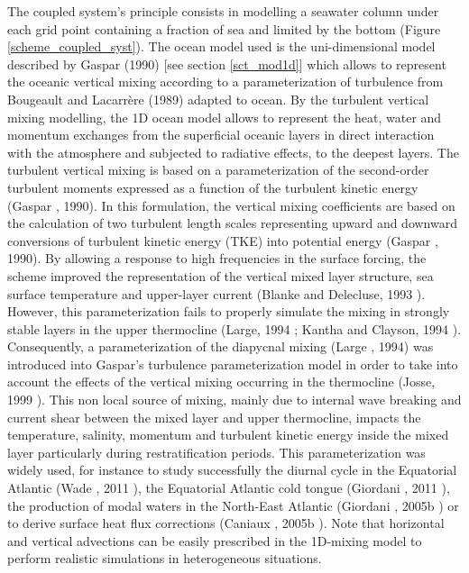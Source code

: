The coupled system's principle consists in modelling a seawater column under each grid point containing a fraction of sea and limited by the bottom (Figure \ref{scheme_coupled_syst}). The ocean model used is the uni-dimensional model described by Gaspar \etal (1990) \nocite{Gaspar1990}
 [see section \ref{sct_mod1d}] which allows to represent the oceanic vertical mixing according to a parameterization of turbulence from Bougeault and Lacarr\`ere (1989)\nocite{BL89}
 adapted to ocean. By the turbulent vertical mixing modelling, the 1D ocean model allows to represent the heat, water and momentum exchanges from the superficial oceanic layers in direct interaction with the atmosphere and subjected to radiative effects, to the deepest layers. The turbulent vertical mixing is based on a parameterization of the second-order turbulent moments expressed as a function of the turbulent kinetic energy (Gaspar \etal, 1990). In this formulation, the vertical mixing coefficients are based on the calculation of two turbulent length scales representing upward and downward conversions of turbulent kinetic energy (TKE) into potential energy (Gaspar \etal, 1990). By allowing a response to high frequencies in the surface forcing, the scheme improved the representation of the vertical mixed layer structure, sea surface temperature and upper-layer current (Blanke and Delecluse, 1993 \nocite{Blanke1993}). However, this parameterization fails to properly simulate the mixing in strongly stable layers in the upper thermocline (Large\etal, 1994 \nocite{Large1994}; Kantha and Clayson, 1994 \nocite{Kantha1994}). Consequently, a parameterization of the diapycnal mixing (Large \etal, 1994) was introduced into Gaspar's turbulence parameterization model in order to take into account the effects of the vertical mixing occurring in the thermocline (Josse, 1999 \nocite{Josse1999}). This non local source of mixing, mainly due to internal wave breaking and current shear between the mixed layer and upper thermocline, impacts the temperature, salinity, momentum and turbulent kinetic energy inside the mixed layer particularly during restratification periods. This parameterization was widely used, for instance to study successfully the diurnal cycle in the Equatorial Atlantic (Wade \etal, 2011 \nocite{Wade2011}), the Equatorial Atlantic cold tongue (Giordani \etal, 2011 \nocite{Giordani2011}), the production of modal waters in the North-East Atlantic (Giordani \etal, 2005b \nocite{Giordani2005b}) or to derive surface heat flux corrections (Caniaux \etal, 2005b \nocite{Caniaux2005b}). Note that horizontal and vertical advections can be easily prescribed in the 1D-mixing model to perform realistic simulations in heterogeneous situations.

